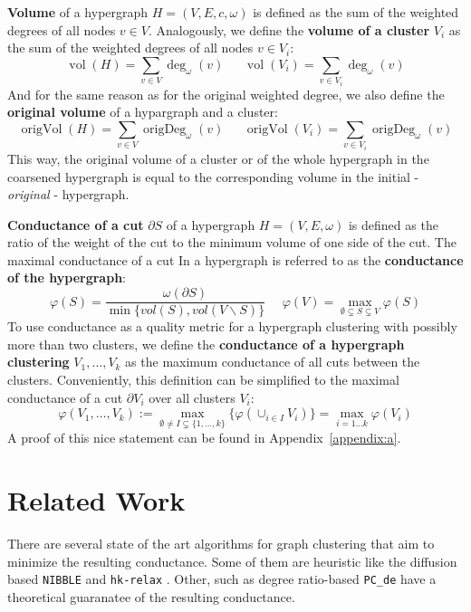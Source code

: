 \documentclass[acmsmall,nonacm,screen,review]{acmart}
\DeclareMathOperator{\vol}{vol}
\DeclareMathOperator{\origVol}{origVol}
\DeclareMathOperator{\origDeg}{origDeg}
\begin{document}
\smallbreak
\noindent\textbf{Volume} of a hypergraph $H = (V, E, c, \omega)$ is defined as the 
sum of the weighted degrees of all nodes $v \in V$. Analogously, we define the 
\textbf{volume of a cluster} $V_i$ as the sum of the weighted degrees of all 
nodes $v \in V_i$:
\[\vol(H) = \sum_{v \in V} \deg_\omega(v) \ \ \ \ \ \ \
\vol(V_i) = \sum_{v \in V_i} \deg_\omega(v)\]
And for the same reason as for the original weighted degree, we also define 
the \textbf{original volume} of a hypargraph and a cluster:
\[\origVol(H) = \sum_{v \in V} \origDeg_\omega(v) \ \ \ \ \ \ \
\origVol(V_i) = \sum_{v \in V_i} \origDeg_\omega(v)\]
This way, the original volume of a cluster or of the whole hypergraph 
in the coarsened hypergraph is equal to the corresponding volume in the initial 
- \textit{original} - hypergraph.

\smallbreak
\noindent\textbf{Conductance of a cut} $\partial S$ of a hypergraph 
$H = (V, E, \omega)$ is defined as the ratio of the weight of the cut to the 
minimum volume of one side of the cut. The maximal conductance of a cut In
a hypergraph is referred to as the \textbf{conductance of the hypergraph}:
\[{\varphi(S)} = \frac{\omega(\partial S)}{\min\{vol(S), vol(V \backslash S)\}}
\ \ \ \ \ \ 
{\varphi(V)} = \max_{\emptyset \subsetneq S \subsetneq V} \varphi(S)
\]
To use conductance as a quality metric for a hypergraph clustering with 
possibly more than two clusters, we define the 
\textbf{conductance of a hypergraph clustering} $V_1, \dots, V_k$ as the 
maximum conductance of all cuts between the clusters. Conveniently, this 
definition can be simplified to the maximal conductance of a cut $\partial V_i$ 
over all clusters $V_i$:
\[\varphi(V_1, \dots, V_k) 
:= \max_{\emptyset \neq I \subsetneq \{1, \dots, k\}} 
        \{\varphi(\cup_{i \in I} V_i)\} = \max_{i = 1 \dots k} \varphi(V_i)\]
A proof of this nice statement can be found in Appendix~\ref{appendix:a}.

\section{Related Work}
\label{sec:related_work}

There are several state of the art algorithms for graph clustering that 
aim to minimize the resulting conductance. Some of them are heuristic like 
the diffusion based \texttt{NIBBLE} \cite{Nibble} and \texttt{hk-relax} \cite{HKRelax}.
Other, such as degree ratio-based \texttt{PC\_de} \cite{PCde} have a theoretical
guaranatee of the resulting conductance. 
\end{document}
